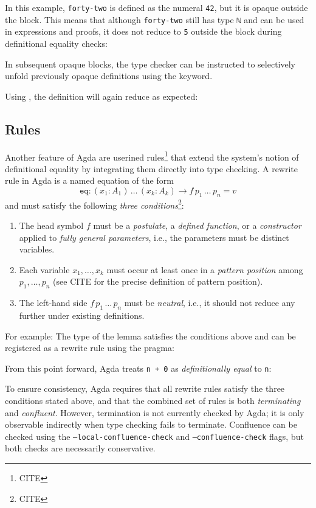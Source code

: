 \documentclass[screen,nonacm]{acmart}
\begin{document}
In this example, \verb|forty-two| is defined as the numeral \verb|42|, but it
is opaque outside the block. This means that although \verb|forty-two| still
has type \verb|ℕ| and can be used in expressions and proofs, it does not reduce
to \verb|5| outside the block during definitional equality checks: \EOpaqueExO

In subsequent opaque blocks, the type checker can be instructed to selectively
unfold previously opaque definitions using the  keyword.

Using , the definition will again reduce as expected:
\EOpaqueExT{}

\subsection*{ Rules}

Another feature of Agda are userined  rules\footnote{CITE}
that extend the system’s notion of definitional equality by integrating them
directly into type checking. A rewrite rule in Agda is a named equation of the
form
\[
      \texttt{eq} : (x_1 : A_1)\, \ldots\, (x_k : A_k) \to f\, p_1\, \ldots\, p_n = v
\]
and must satisfy the following \emph{three conditions}\footnote{CITE}:
\begin{enumerate}
      \item The head symbol $f$ must be a \emph{postulate}, a \emph{defined function}, or a
            \emph{constructor} applied to \emph{fully general parameters}, i.e., the
            parameters must be distinct variables.
      \item Each variable $x_1, \ldots, x_k$ must occur at least once in a \emph{pattern
                  position} among $p_1, \ldots, p_n$ (see CITE for the precise definition of
            pattern position).
      \item The left-hand side $f\, p_1\, \ldots\, p_n$ must be \emph{neutral}, i.e., it
            should not reduce any further under existing definitions.
\end{enumerate}

For example: \ERewrite{} The type of the lemma satisfies the conditions above
and can be registered as a rewrite rule using the  pragma:
\ERewriteIt{}

From this point forward, Agda treats \verb|n + 0| as \emph{definitionally
      equal} to \verb|n|: \ERewriteEx

To ensure consistency, Agda requires that all rewrite rules satisfy the three
conditions stated above, and that the combined set of rules is both
\emph{terminating} and \emph{confluent}. However, termination is not currently
checked by Agda; it is only observable indirectly when type checking fails to
terminate. Confluence can be checked using the
\texttt{--local-confluence-check} and \texttt{--confluence-check} flags, but
both checks are necessarily conservative.
\end{document}
